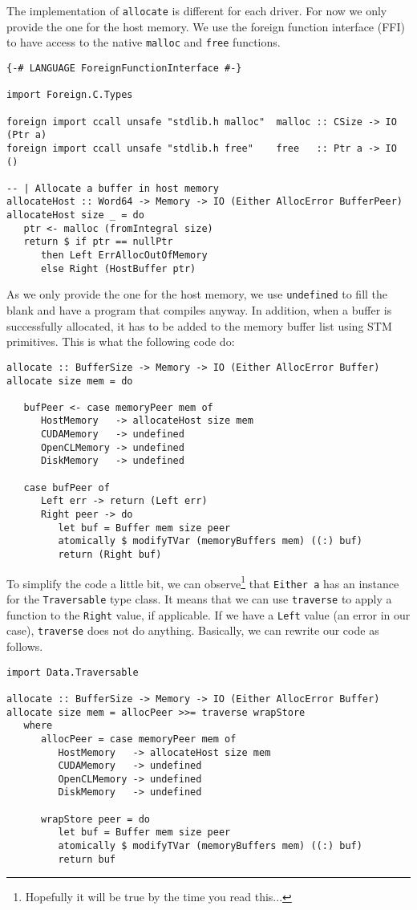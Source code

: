 The implementation of \texttt{allocate} is different for each driver. For now we
only provide the one for the host memory. We use the foreign function interface
(FFI) to have access to the native \texttt{malloc} and \texttt{free} functions.

\begin{lstlisting}
{-# LANGUAGE ForeignFunctionInterface #-}

import Foreign.C.Types

foreign import ccall unsafe "stdlib.h malloc"  malloc :: CSize -> IO (Ptr a)
foreign import ccall unsafe "stdlib.h free"    free   :: Ptr a -> IO ()

-- | Allocate a buffer in host memory
allocateHost :: Word64 -> Memory -> IO (Either AllocError BufferPeer)
allocateHost size _ = do
   ptr <- malloc (fromIntegral size)
   return $ if ptr == nullPtr
      then Left ErrAllocOutOfMemory
      else Right (HostBuffer ptr)
\end{lstlisting}

As we only provide the one for the host memory, we use \texttt{undefined} to
fill the blank and have a program that compiles anyway. In addition, when a
buffer is successfully allocated, it has to be added to the memory buffer list
using STM primitives. This is what the following code do:

\begin{lstlisting}
allocate :: BufferSize -> Memory -> IO (Either AllocError Buffer)
allocate size mem = do

   bufPeer <- case memoryPeer mem of
      HostMemory   -> allocateHost size mem
      CUDAMemory   -> undefined
      OpenCLMemory -> undefined
      DiskMemory   -> undefined

   case bufPeer of
      Left err -> return (Left err)
      Right peer -> do
         let buf = Buffer mem size peer
         atomically $ modifyTVar (memoryBuffers mem) ((:) buf)
         return (Right buf)
\end{lstlisting}

To simplify the code a little bit, we can observe\footnote{Hopefully it will be
true by the time you read this...} that \texttt{Either a} has an instance for
the \texttt{Traversable} type class. It means that we can use \texttt{traverse}
to apply a function to the \texttt{Right} value, if applicable. If we have a
\texttt{Left} value (an error in our case), \texttt{traverse} does not do
anything. Basically, we can rewrite our code as follows.

\begin{lstlisting}
import Data.Traversable

allocate :: BufferSize -> Memory -> IO (Either AllocError Buffer)
allocate size mem = allocPeer >>= traverse wrapStore
   where
      allocPeer = case memoryPeer mem of
         HostMemory   -> allocateHost size mem
         CUDAMemory   -> undefined
         OpenCLMemory -> undefined
         DiskMemory   -> undefined

      wrapStore peer = do
         let buf = Buffer mem size peer
         atomically $ modifyTVar (memoryBuffers mem) ((:) buf)
         return buf
\end{lstlisting}

